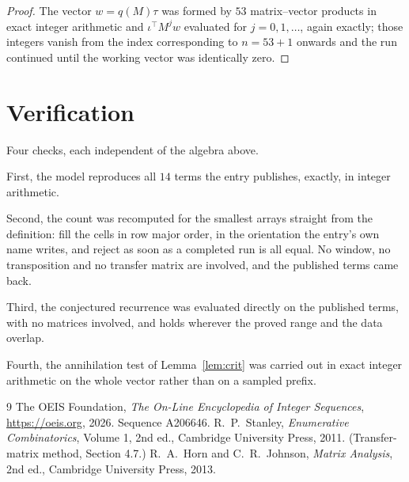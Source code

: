 \documentclass[11pt,a4paper]{article}
\theoremstyle{plain}
\theoremstyle{definition}
\begin{document}
\begin{proof}
The vector $w=q(M)\tau$ was formed by $53$ matrix--vector products in exact integer
arithmetic and $\iota^{\!\top}M^{j}w$ evaluated for $j=0,1,\dots$, again exactly; those
integers vanish from the index corresponding to $n=53+1$ onwards and the run continued
until the working vector was identically zero.
\end{proof}

\section{Verification}

Four checks, each independent of the algebra above.

First, the model reproduces all $14$ terms the entry publishes, exactly, in integer
arithmetic.

Second, the count was recomputed for the smallest arrays straight from the definition: fill the
cells in row major order, in the orientation the entry's own name writes, and reject as soon as
a completed run is all equal. No window, no transposition and no transfer matrix are involved, and
the published terms came back.

Third, the conjectured recurrence was evaluated directly on the published terms, with no
matrices involved, and holds wherever the proved range and the data overlap.

Fourth, the annihilation test of Lemma~\ref{lem:crit} was carried out in exact integer
arithmetic on the whole vector rather than on a sampled prefix.

\begin{thebibliography}{9}
 The OEIS Foundation, \emph{The On-Line Encyclopedia of Integer
Sequences}, \url{https://oeis.org}, 2026. Sequence A206646.
 R.~P.~Stanley, \emph{Enumerative Combinatorics}, Volume 1, 2nd ed.,
Cambridge University Press, 2011. (Transfer-matrix method, Section 4.7.)
 R.~A.~Horn and C.~R.~Johnson, \emph{Matrix Analysis}, 2nd ed., Cambridge
University Press, 2013.
\end{thebibliography}
\end{document}
